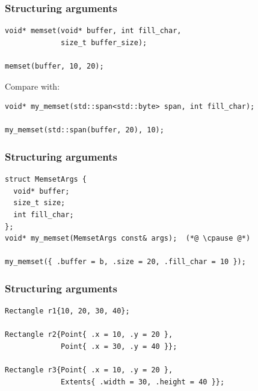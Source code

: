 \documentclass[aspectratio=169]{beamer}
\newif\iftransitions
\newcommand{\cpause}{\iftransitions \pause \fi}
\begin{document}
\begin{frame}[fragile]
  \frametitle{Structuring arguments}
  
  \begin{lstlisting}[style=cpp20]
void* memset(void* buffer, int fill_char,
             size_t buffer_size);
  
memset(buffer, 10, 20);
  \end{lstlisting}

  \cpause

  \vspace{10pt}
  Compare with:

  \begin{lstlisting}[style=cpp20]
void* my_memset(std::span<std::byte> span, int fill_char);
  
my_memset(std::span(buffer, 20), 10);
  \end{lstlisting}
  
\end{frame}


\begin{frame}[fragile]
  \frametitle{Structuring arguments}

  \begin{lstlisting}[style=cpp20]
struct MemsetArgs {
  void* buffer;
  size_t size;
  int fill_char;
};
void* my_memset(MemsetArgs const& args);  (*@ \cpause @*)
  
my_memset({ .buffer = b, .size = 20, .fill_char = 10 });
  \end{lstlisting}
  
\end{frame}

\begin{frame}[fragile]
  \frametitle{Structuring arguments}
  
  \begin{lstlisting}[style=cpp20]
Rectangle r1{10, 20, 30, 40};

Rectangle r2{Point{ .x = 10, .y = 20 },
             Point{ .x = 30, .y = 40 }};

Rectangle r3{Point{ .x = 10, .y = 20 },
             Extents{ .width = 30, .height = 40 }};
  \end{lstlisting}
\end{frame}
\end{document}
